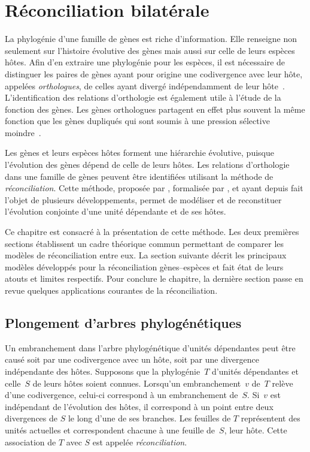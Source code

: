\chapter{Réconciliation bilatérale}

La phylogénie d’une famille de gènes est riche d’information.
Elle renseigne non seulement sur l’histoire évolutive des gènes mais aussi sur celle de leurs espèces hôtes.
Afin d’en extraire une phylogénie pour les espèces, il est nécessaire de distinguer les paires de gènes ayant pour origine une codivergence avec leur hôte, appelées \emph{orthologues}, de celles ayant divergé indépendamment de leur hôte~\parencite{Fitch1970DistinguishingHomologousAnalogous}.
L’identification des relations d’orthologie est également utile à l’étude de la fonction des gènes.
Les gènes orthologues partagent en effet plus souvent la même fonction que les gènes dupliqués qui sont soumis à une pression sélective moindre~\parencite{Lynch2001ProbabilityPreservationNewly}.

Les gènes et leurs espèces hôtes forment une hiérarchie évolutive, puisque l’évolution des gènes dépend de celle de leurs hôtes.
Les relations d’orthologie dans une famille de gènes peuvent être identifiées utilisant la méthode de \emph{réconciliation}.
Cette méthode, proposée par \textcite{Goodman1979FittingGeneLineage}, formalisée par \textcite{Page1994MapsTreesCladistic}, et ayant depuis fait l’objet de plusieurs développements, permet de modéliser et de reconstituer l’évolution conjointe d’une unité dépendante et de ses hôtes.

Ce chapitre est consacré à la présentation de cette méthode.
Les deux premières sections établissent un cadre théorique commun permettant de comparer les modèles de réconciliation entre eux.
La section suivante décrit les principaux modèles développés pour la réconciliation gènes--espèces et fait état de leurs atouts et limites respectifs.
Pour conclure le chapitre, la dernière section passe en revue quelques applications courantes de la réconciliation.

\section{Plongement d’arbres phylogénétiques}

Un embranchement dans l’arbre phylogénétique d’unités dépendantes peut être causé soit par une codivergence avec un hôte, soit par une divergence indépendante des hôtes.
Supposons que la phylogénie~\(T\) d’unités dépendantes et celle~\(S\) de leurs hôtes soient connues.
Lorsqu’un embranchement~\(v\) de~\(T\) relève d’une codivergence, celui-ci correspond à un embranchement de~\(S\).
Si~\(v\) est indépendant de l’évolution des hôtes, il correspond à un point entre deux divergences de \(S\) le long d’une de ses branches.
Les feuilles de \(T\) représentent des unités actuelles et correspondent chacune à une feuille de~\(S\), leur hôte.
Cette association de \(T\) avec \(S\) est appelée \emph{réconciliation}.

